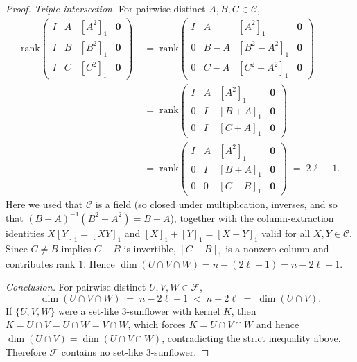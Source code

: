 \documentclass[10pt,a4paper]{amsart}
\begin{document}
\begin{proof}
\textit{Triple intersection.} For pairwise distinct $A, B, C \in \mathcal{C}$,
\begin{align*}
\mathrm{rank}\begin{pmatrix} I & A & [A^2]_1 & \mathbf{0} \\ I & B & [B^2]_1 & \mathbf{0} \\ I & C & [C^2]_1 & \mathbf{0} \end{pmatrix}
&\;=\; \mathrm{rank}\begin{pmatrix} I & A & [A^2]_1 & \mathbf{0} \\ 0 & B - A & [B^2 - A^2]_1 & \mathbf{0} \\ 0 & C - A & [C^2 - A^2]_1 & \mathbf{0} \end{pmatrix} \\
&\;=\; \mathrm{rank}\begin{pmatrix} I & A & [A^2]_1 & \mathbf{0} \\ 0 & I & [B + A]_1 & \mathbf{0} \\ 0 & I & [C + A]_1 & \mathbf{0} \end{pmatrix} \\
&\;=\; \mathrm{rank}\begin{pmatrix} I & A & [A^2]_1 & \mathbf{0} \\ 0 & I & [B + A]_1 & \mathbf{0} \\ 0 & 0 & [C - B]_1 & \mathbf{0} \end{pmatrix} \;=\; 2\ell + 1.
\end{align*}
Here we used that $\mathcal{C}$ is a field (so closed under multiplication, inverses, and so that $(B-A)^{-1}(B^2 - A^2) = B + A$), together with the column-extraction identities $X[Y]_1 = [XY]_1$ and $[X]_1 + [Y]_1 = [X+Y]_1$ valid for all $X, Y \in \mathcal{C}$. Since $C \neq B$ implies $C - B$ is invertible, $[C-B]_1$ is a nonzero column and contributes rank $1$. Hence $\dim(U \cap V \cap W) = n - (2\ell + 1) = n - 2\ell - 1$.

\textit{Conclusion.} For pairwise distinct $U, V, W \in \mathcal{F}$,
\[
\dim(U \cap V \cap W) \;=\; n - 2\ell - 1 \;<\; n - 2\ell \;=\; \dim(U \cap V).
\]
If $\{U, V, W\}$ were a set-like $3$-sunflower with kernel $K$, then $K = U \cap V = U \cap W = V \cap W$, which forces $K = U \cap V \cap W$ and hence $\dim(U \cap V) = \dim(U \cap V \cap W)$, contradicting the strict inequality above. Therefore $\mathcal{F}$ contains no set-like $3$-sunflower.
\end{proof}
\end{document}
